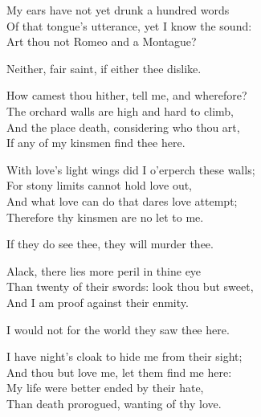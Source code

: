 \begin{speech}
My ears have not yet drunk a hundred words \\
Of that tongue's utterance, yet I know the sound: \\
Art thou not Romeo and a Montague? \\
\end{speech}
\begin{speech}
Neither, fair saint, if either thee dislike. \\
\end{speech}
\begin{speech}
How camest thou hither, tell me, and wherefore? \\

The orchard walls are high and hard to climb, \\
And the place death, considering who thou art, \\
If any of my kinsmen find thee here. \\
\end{speech}
\begin{speech}
With love's light wings did I o'erperch these walls;
\\
For stony limits cannot hold love out, \\
And what love can do that dares love attempt; \\
Therefore thy kinsmen are no let to me. \\
\end{speech}
\begin{speech}
If they do see thee, they will murder thee. \\
\end{speech}
\begin{speech}
Alack, there lies more peril in thine eye \\
Than twenty of their swords: look thou but sweet, \\
And I am proof against their enmity. \\
\end{speech}
\begin{speech}
I would not for the world they saw thee here. \\
\end{speech}
\begin{speech}
I have night's cloak to hide me from their sight;
\\
And thou but love me, let them find me here: \\
My life were better ended by their hate, \\
Than death prorogued, wanting of thy love. \\
\end{speech}
